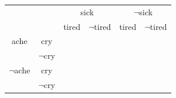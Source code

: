 \documentclass{article}%
\begin{document}
\begin{enumerate}
	\begin{table}[h]
	\centering
	\begin{tabular}{|c|c|c|c|c|c|}
	\hline
	\multicolumn{2}{|c|}{}&\multicolumn{2}{c|}{sick}&\multicolumn{2}{c|}{$\neg$sick} \\ \cline{3-6}
	\multicolumn{2}{|c|}{}&tired&$\neg$tired&tired&$\neg$tired \\ \hline
	ache&cry& & & & \\ \cline{2-6}
	&$\neg$cry& & & & \\ \hline
	$\neg$ache&cry& & & & \\ \cline{2-6}
	&$\neg$cry& & & & \\ \hline
	\end{tabular}
	\end{table}
	 
\end{enumerate}
\end{document}
